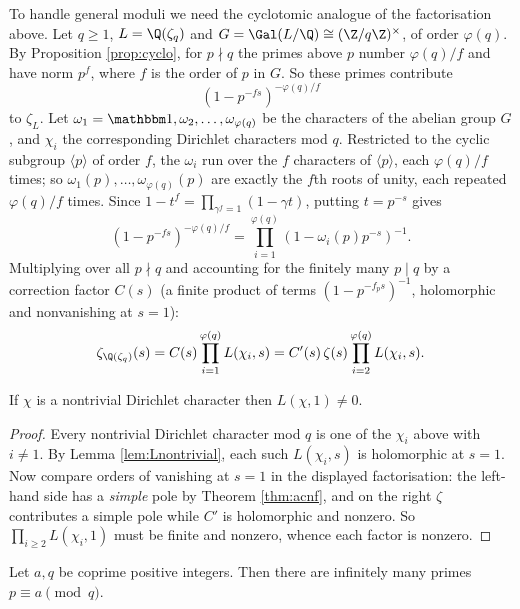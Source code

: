 To handle general moduli we need the cyclotomic analogue of the factorisation above. Let $q \geq 1$, $L = \Q(\zeta_q)$ and $G = \Gal(L/\Q) \cong (\Z/q\Z)^\times$, of order $\varphi(q)$. By Proposition \ref{prop:cyclo}, for $p \nmid q$ the primes above $p$ number $\varphi(q)/f$ and have norm $p^f$, where $f$ is the order of $p$ in $G$. So these primes contribute
$$\left(1-p^{-fs}\right)^{-\varphi(q)/f}$$
to $\zeta_L$. Let $\omega_1 = \mathbbm 1,\omega_2,\dots,\omega_{\varphi(q)}$ be the characters of the abelian group $G$, and $\chi_i$ the corresponding Dirichlet characters mod $q$. Restricted to the cyclic subgroup $\langle p\rangle$ of order $f$, the $\omega_i$ run over the $f$ characters of $\langle p \rangle$, each $\varphi(q)/f$ times; so $\omega_1(p),\dots,\omega_{\varphi(q)}(p)$ are exactly the $f$th roots of unity, each repeated $\varphi(q)/f$ times. Since $1-t^f = \prod_{\gamma^f=1}(1-\gamma t)$, putting $t = p^{-s}$ gives
$$\left(1-p^{-fs}\right)^{-\varphi(q)/f} = \prod_{i=1}^{\varphi(q)}\left(1-\omega_i(p)p^{-s}\right)^{-1}.$$
Multiplying over all $p \nmid q$ and accounting for the finitely many $p \mid q$ by a correction factor $C(s)$ (a finite product of terms $(1-p^{-f_ps})^{-1}$, holomorphic and nonvanishing at $s=1$):
$$\zeta_{\Q(\zeta_q)}(s) = C(s)\prod_{i=1}^{\varphi(q)}L(\chi_i,s) = C'(s)\,\zeta(s)\prod_{i=2}^{\varphi(q)}L(\chi_i,s).$$

\begin{theorem}\label{thm:Lnonzero}
	If $\chi$ is a nontrivial Dirichlet character then $L(\chi,1) \neq 0$.
\end{theorem}

\begin{proof}
	Every nontrivial Dirichlet character mod $q$ is one of the $\chi_i$ above with $i \neq 1$. By Lemma \ref{lem:Lnontrivial}, each such $L(\chi_i,s)$ is holomorphic at $s = 1$. Now compare orders of vanishing at $s = 1$ in the displayed factorisation: the left-hand side has a \emph{simple} pole by Theorem \ref{thm:acnf}, and on the right $\zeta$ contributes a simple pole while $C'$ is holomorphic and nonzero. So $\prod_{i\ge2}L(\chi_i,1)$ must be finite and nonzero, whence each factor is nonzero.
\end{proof}

\begin{theorem}[Dirichlet]\label{thm:primesAP}
	Let $a, q$ be coprime positive integers. Then there are infinitely many primes $p \equiv a \pmod q$.
\end{theorem}

